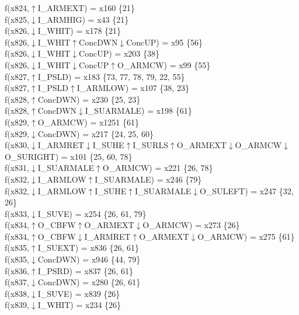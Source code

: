 f(x824,$\uparrow$I\_ARMEXT) = x160 \{21\} \\  
f(x825,$\downarrow$I\_ARMHIG) = x43 \{21\} \\  
f(x826,$\downarrow$I\_WHIT) = x178 \{21\} \\  
f(x826,$\downarrow$I\_WHIT$\uparrow$ConcDWN$\downarrow$ConcUP) = x95 \{56\} \\  
f(x826,$\downarrow$I\_WHIT$\downarrow$ConcUP) = x203 \{38\} \\  
f(x826,$\downarrow$I\_WHIT$\downarrow$ConcUP$\uparrow$O\_ARMCW) = x99 \{55\} \\  
f(x827,$\uparrow$I\_PSLD) = x183 \{73, 77, 78, 79, 22, 55\} \\  
f(x827,$\uparrow$I\_PSLD$\uparrow$I\_ARMLOW) = x107 \{38, 23\} \\  
f(x828,$\uparrow$ConcDWN) = x230 \{25, 23\} \\  
f(x828,$\uparrow$ConcDWN$\downarrow$I\_SUARMALE) = x198 \{61\} \\  
f(x829,$\uparrow$O\_ARMCW) = x1251 \{61\} \\  
f(x829,$\downarrow$ConcDWN) = x217 \{24, 25, 60\} \\  
f(x830,$\downarrow$I\_ARMRET$\downarrow$I\_SUHE$\uparrow$I\_SURLS$\uparrow$O\_ARMEXT$\downarrow$O\_ARMCW$\downarrow$O\_SURIGHT) = x101 \{25, 60, 78\} \\  
f(x831,$\downarrow$I\_SUARMALE$\uparrow$O\_ARMCW) = x221 \{26, 78\} \\  
f(x832,$\downarrow$I\_ARMLOW$\uparrow$I\_SUARMALE) = x246 \{79\} \\  
f(x832,$\downarrow$I\_ARMLOW$\uparrow$I\_SUHE$\uparrow$I\_SUARMALE$\downarrow$O\_SULEFT) = x247 \{32, 26\} \\  
f(x833,$\downarrow$I\_SUVE) = x254 \{26, 61, 79\} \\  
f(x834,$\uparrow$O\_CBFW$\uparrow$O\_ARMEXT$\downarrow$O\_ARMCW) = x273 \{26\} \\  
f(x834,$\uparrow$O\_CBFW$\downarrow$I\_ARMRET$\uparrow$O\_ARMEXT$\downarrow$O\_ARMCW) = x275 \{61\} \\  
f(x835,$\uparrow$I\_SUEXT) = x836 \{26, 61\} \\  
f(x835,$\downarrow$ConcDWN) = x946 \{44, 79\} \\  
f(x836,$\uparrow$I\_PSRD) = x837 \{26, 61\} \\  
f(x837,$\downarrow$ConcDWN) = x280 \{26, 61\} \\  
f(x838,$\downarrow$I\_SUVE) = x839 \{26\} \\  
f(x839,$\downarrow$I\_WHIT) = x234 \{26\} \\  
